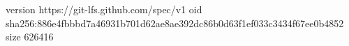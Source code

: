 version https://git-lfs.github.com/spec/v1
oid sha256:886e4fbbbd7a46931b701d62ae8ae392dc86b0d63f1ef033c3434f67ee0b4852
size 626416
